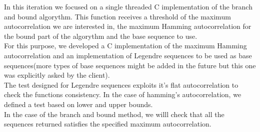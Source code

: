      In this iteration we focused on a single threaded C implementation of the
      branch and bound algorythm. This function receives a threshold of the
      maximum autocorrelation we are interested in, the maximum Hamming
      autocorrelation for the bound part of the algorythm and the base sequence
      to use.\\

      For this purpose, we developed a C implementation of the maximum Hamming
      autocorrelation and an implementation of Legendre sequences to be used
      as base sequences(more types of base sequences might be added in the
      future but this one was explicitly asked by the client).\\

      The test designed for Legendre sequences exploits it's flat
      autocorrelation to check the functions consistency. In the case of
      hamming's autocorrelation, we defined a test based on lower and upper
      bounds.\\

      In the case of the branch and bound method, we willl check that all the
      sequences returned satisfies the specified maximum autocorrelation.\\
